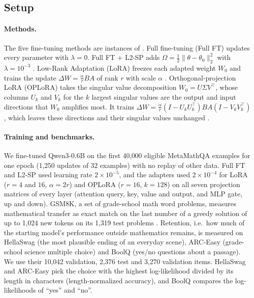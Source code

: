 \documentclass{article}
\begin{document}
\subsection{Setup}
\paragraph{Methods.} The five fine-tuning methods are instances of . Full fine-tuning (Full FT) updates every parameter with $\lambda=0$. Full FT + L2-SP adds $\Omega=\tfrac12\lVert\theta-\theta_0\rVert_2^2$ with $\lambda=10^{-3}$ \citep{l2sp}. Low-Rank Adaptation (LoRA) freezes each adapted weight $W_0$ and trains the update $\Delta W=\tfrac{\alpha}{r}BA$ of rank $r$ with scale $\alpha$ \citep{lora}. Orthogonal-projection LoRA (OPLoRA) takes the singular value decomposition $W_0=U\Sigma V^\top$, whose columns $U_k$ and $V_k$ for the $k$ largest singular values are the output and input directions that $W_0$ amplifies most. It trains $\Delta W=\tfrac{\alpha}{r}(I-U_kU_k^\top)BA(I-V_kV_k^\top)$, which leaves these directions and their singular values unchanged \citep{oplora}.

\paragraph{Training and benchmarks.} We fine-tuned Qwen3-0.6B \citep{qwen3} on the first 40,000 eligible MetaMathQA examples \citep{metamath} for one epoch (1,250 updates of 32 examples) with no replay of other data. Full FT and L2-SP used learning rate $2\times10^{-5}$, and the adapters used $2\times10^{-4}$ for LoRA ($r=4$ and $16$, $\alpha=2r$) and OPLoRA ($r=16$, $k=128$) on all seven projection matrices of every layer (attention query, key, value and output, and MLP gate, up and down). GSM8K, a set of grade-school math word problems, measures mathematical transfer as exact match on the last number of a greedy solution of up to 1,024 new tokens on its 1,319 test problems \citep{gsm8k}. Retention, i.e.\ how much of the starting model's performance outside mathematics remains, is measured on HellaSwag (the most plausible ending of an everyday scene), ARC-Easy (grade-school science multiple choice) and BoolQ (yes/no questions about a passage). We use their 10,042 validation, 2,376 test and 3,270 validation items. HellaSwag and ARC-Easy pick the choice with the highest log-likelihood divided by its length in characters (length-normalized accuracy), and BoolQ compares the log-likelihoods of ``yes'' and ``no''.
\end{document}
